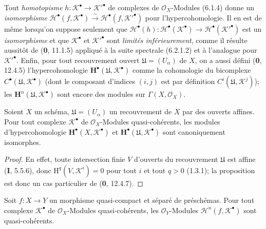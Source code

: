 \begin{env}[6.2.1]
Tout \emph{homotopisme} $h:\mathscr K^\bullet\to\mathscr K'^\bullet$ de complexes de
$\mathscr O_X$-Modules (6.1.4) donne un \emph{isomorphisme}
$\mathscr H^\bullet(f,\mathscr K^\bullet)\xrightarrow{\sim}
\mathscr H^\bullet(f,\mathscr K'^\bullet)$ pour l'hypercohomologie. Il en est
de même lorsqu'on suppose seulement que
$\mathscr H^\bullet(h):\mathscr H^\bullet(\mathscr K^\bullet)\to
\mathscr H^\bullet(\mathscr K'^\bullet)$ est un \emph{isomorphisme} et que
$\mathscr K^\bullet$ et $\mathscr K'^\bullet$ sont \emph{limités inférieurement},
comme il résulte aussitôt de (\textbf{0}, 11.1.5) appliqué à la suite spectrale
(6.2.1.2) et à l'analogue pour $\mathscr K'^\bullet$. Enfin, pour tout
recouvrement ouvert $\mathfrak U=(U_\alpha)$ de $X$, on a aussi défini
(\textbf{0}, 12.4.5) l'hypercohomologie
$\mathbf H^\bullet(\mathfrak U,\mathscr K^\bullet)$ comme la cohomologie du
bicomplexe $C^\bullet(\mathfrak U,\mathscr K^\bullet)$ (dont le composant
d'indices $(i,j)$ est par définition
$C^i(\mathfrak U,\mathscr K^j)$); les
$\mathbf H^n(\mathfrak U,\mathscr K^\bullet)$ sont encore des modules sur
$\Gamma(X,\mathscr O_X)$.
\end{env}

\begin{proposition}[6.2.2]
Soient $X$ un schéma, $\mathfrak U=(U_\alpha)$ un recouvrement de $X$ par des
ouverts affines. Pour tout complexe $\mathscr K^\bullet$ de
$\mathscr O_X$-Modules quasi-cohérents, les modules d'hypercohomologie
$\mathbf H^\bullet(X,\mathscr K^\bullet)$ et
$\mathbf H^\bullet(\mathfrak U,\mathscr K^\bullet)$ sont canoniquement
isomorphes.
\end{proposition}

\begin{proof}
En effet, toute intersection finie $V$ d'ouverts du recouvrement
$\mathfrak U$ est affine (\textbf{I}, 5.5.6), donc
$\mathrm H^q(V,\mathscr K^i)=0$ pour tout $i$ et tout $q>0$ (1.3.1); la
proposition est donc un cas particulier de (\textbf{0}, 12.4.7).
\end{proof}

\begin{proposition}[6.2.3]
Soit $f:X\to Y$ un morphisme quasi-compact et séparé de préschémas. Pour tout
complexe $\mathscr K^\bullet$ de $\mathscr O_X$-Modules quasi-cohérents, les
$\mathscr O_Y$-Modules $\mathscr H^n(f,\mathscr K^\bullet)$ sont
quasi-cohérents.
\end{proposition}

